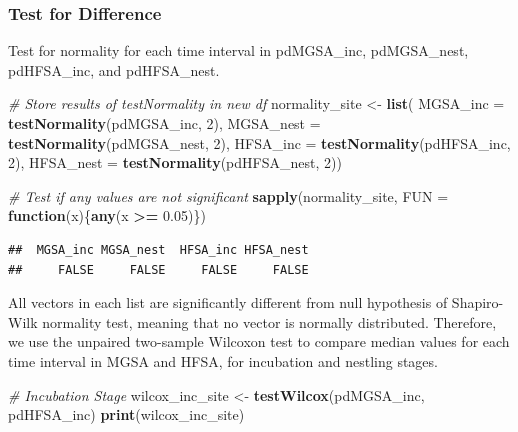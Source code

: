 \documentclass[]{article}
\newenvironment{Shaded}{\begin{snugshade}}{\end{snugshade}}
\newcommand{\CommentTok}[1]{\textcolor[rgb]{0.56,0.35,0.01}{\textit{#1}}}
\newcommand{\ControlFlowTok}[1]{\textcolor[rgb]{0.13,0.29,0.53}{\textbf{#1}}}
\newcommand{\DataTypeTok}[1]{\textcolor[rgb]{0.13,0.29,0.53}{#1}}
\newcommand{\DecValTok}[1]{\textcolor[rgb]{0.00,0.00,0.81}{#1}}
\newcommand{\FloatTok}[1]{\textcolor[rgb]{0.00,0.00,0.81}{#1}}
\newcommand{\KeywordTok}[1]{\textcolor[rgb]{0.13,0.29,0.53}{\textbf{#1}}}
\newcommand{\NormalTok}[1]{#1}
\newcommand{\OperatorTok}[1]{\textcolor[rgb]{0.81,0.36,0.00}{\textbf{#1}}}
\newcommand{\StringTok}[1]{\textcolor[rgb]{0.31,0.60,0.02}{#1}}
\begin{document}
\hypertarget{test-for-difference-1}{%
\subsubsection{Test for Difference}\label{test-for-difference-1}}

Test for normality for each time interval in pdMGSA\_inc, pdMGSA\_nest,
pdHFSA\_inc, and pdHFSA\_nest.

\begin{Shaded}
\begin{Highlighting}[]
\CommentTok{# Store results of testNormality in new df}
\NormalTok{normality_site <-}\StringTok{ }\KeywordTok{list}\NormalTok{(}
  \DataTypeTok{MGSA_inc =} \KeywordTok{testNormality}\NormalTok{(pdMGSA_inc, }\DecValTok{2}\NormalTok{), }
  \DataTypeTok{MGSA_nest =} \KeywordTok{testNormality}\NormalTok{(pdMGSA_nest, }\DecValTok{2}\NormalTok{), }
  \DataTypeTok{HFSA_inc =} \KeywordTok{testNormality}\NormalTok{(pdHFSA_inc, }\DecValTok{2}\NormalTok{),}
  \DataTypeTok{HFSA_nest =} \KeywordTok{testNormality}\NormalTok{(pdHFSA_nest, }\DecValTok{2}\NormalTok{))}

\CommentTok{# Test if any values are not significant}
\KeywordTok{sapply}\NormalTok{(normality_site, }\DataTypeTok{FUN =} \ControlFlowTok{function}\NormalTok{(x)\{}\KeywordTok{any}\NormalTok{(x }\OperatorTok{>=}\StringTok{ }\FloatTok{0.05}\NormalTok{)\})}
\end{Highlighting}
\end{Shaded}

\begin{verbatim}
##  MGSA_inc MGSA_nest  HFSA_inc HFSA_nest 
##     FALSE     FALSE     FALSE     FALSE
\end{verbatim}

All vectors in each list are significantly different from null
hypothesis of Shapiro-Wilk normality test, meaning that no vector is
normally distributed. Therefore, we use the unpaired two-sample Wilcoxon
test to compare median values for each time interval in MGSA and HFSA,
for incubation and nestling stages.

\begin{Shaded}
\begin{Highlighting}[]
\CommentTok{# Incubation Stage}
\NormalTok{wilcox_inc_site <-}\StringTok{ }\KeywordTok{testWilcox}\NormalTok{(pdMGSA_inc, pdHFSA_inc)}
\KeywordTok{print}\NormalTok{(wilcox_inc_site)}
\end{Highlighting}
\end{Shaded}
\end{document}
